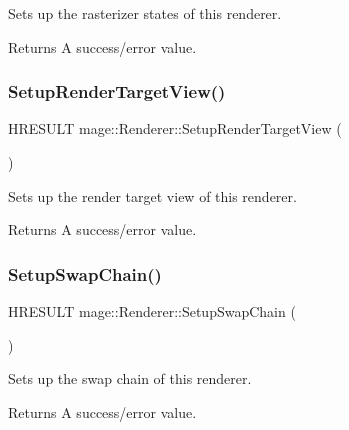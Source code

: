 Sets up the rasterizer states of this renderer.

\begin{DoxyReturn}{Returns}
A success/error value. 
\end{DoxyReturn}
\hypertarget{classmage_1_1_renderer_afe99715a4ae6432ba561dcab048f79b4}{}\label{classmage_1_1_renderer_afe99715a4ae6432ba561dcab048f79b4} 
\subsubsection{\texorpdfstring{Setup\+Render\+Target\+View()}{SetupRenderTargetView()}}
{\footnotesize\ttfamily H\+R\+E\+S\+U\+LT mage\+::\+Renderer\+::\+Setup\+Render\+Target\+View (\begin{DoxyParamCaption}{ }\end{DoxyParamCaption})\hspace{0.3cm}{\ttfamily [private]}}

Sets up the render target view of this renderer.

\begin{DoxyReturn}{Returns}
A success/error value. 
\end{DoxyReturn}
\hypertarget{classmage_1_1_renderer_af2aa545594936261bf2639e4e0814a83}{}\label{classmage_1_1_renderer_af2aa545594936261bf2639e4e0814a83} 
\subsubsection{\texorpdfstring{Setup\+Swap\+Chain()}{SetupSwapChain()}}
{\footnotesize\ttfamily H\+R\+E\+S\+U\+LT mage\+::\+Renderer\+::\+Setup\+Swap\+Chain (\begin{DoxyParamCaption}{ }\end{DoxyParamCaption})\hspace{0.3cm}{\ttfamily [private]}}

Sets up the swap chain of this renderer.

\begin{DoxyReturn}{Returns}
A success/error value. 
\end{DoxyReturn}
\hypertarget{classmage_1_1_renderer_a18937e12912fe18b935893dc6502b92f}{}\label{classmage_1_1_renderer_a18937e12912fe18b935893dc6502b92f} 
